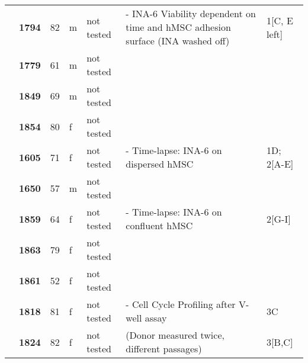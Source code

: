 {\begin{longtable}{|>{\bfseries}p{1.5cm}|>{\bfseries}p{1.2cm}|p{1.2cm}|p{1cm}|p{2.3cm}|p{6cm}|p{1.7cm}|}
    \hhline{~------}
     & 1794  & 82 & m & not tested & - INA-6 Viability dependent on time and hMSC adhesion surface (INA washed off)                           & 1[C, E left]                            \\
    \hhline{~----~~}
     & 1779  & 61 & m & not tested &                                                                                                          &                                         \\
    \hhline{~----~~}
     & 1849  & 69 & m & not tested &                                                                                                          &                                         \\
    \hhline{~----~~}
     & 1854  & 80 & f & not tested &                                                                                                          &                                         \\
    \hhline{~------}
     & 1605  & 71 & f & not tested & - Time-lapse: INA-6 on dispersed hMSC                                                                    & 1D; 2[A-E]                              \\
    \hhline{~----~~}
     & 1650  & 57 & m & not tested &                                                                                                          &                                         \\
    \hhline{~------}
     & 1859  & 64 & f & not tested & - Time-lapse: INA-6 on confluent hMSC                                                                    & 2[G-I]                                  \\
    \hhline{~----~~}
     & 1863  & 79 & f & not tested &                                                                                                          &                                         \\
    \hhline{~----~~}
     & 1861  & 52 & f & not tested &                                                                                                          &                                         \\
    \hhline{~------}
     & 1818  & 81 & f & not tested & - Cell Cycle Profiling after V-well assay                                                                & 3C                                      \\
    \hhline{~------}
     & 1824  & 82 & f & not tested & (Donor measured twice, different passages)                                                               & 3[B,C]                                  \\

\end{longtable}}
